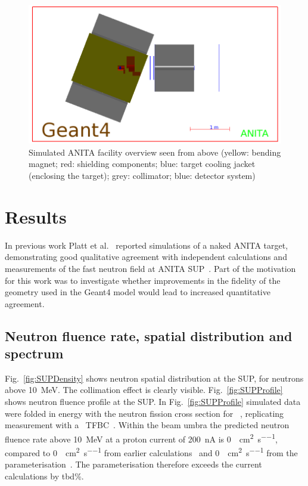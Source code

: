 \documentclass[11pt,a4paper]{IEEEtran}
\let\MYoriglatexcaption\caption
\renewcommand{\caption}[2][\relax]{\MYoriglatexcaption[#2]{#2}}
\def\U238{\BPChem{\^{238}U}}
\begin{document}
\begin{figure}[t]
	\centering
	\includegraphics[width=\columnwidth]{overview.png}
	\caption{
        Simulated ANITA facility overview seen from above (yellow: bending magnet; red: shielding components; blue: target cooling jacket (enclosing the target); grey: collimator; blue: detector system)
    }
	\label{fig:ANITAoverview}
\end{figure}

\section{Results}
In previous work Platt et al.~\cite{Platt13} reported simulations of a naked ANITA target, demonstrating good qualitative agreement with independent calculations and measurements of the fast neutron field at ANITA SUP~\cite{Prokofiev2009}.
Part of the motivation for this work was to investigate whether improvements in the fidelity of the geometry used in the Geant4 model would lead to increased quantitative agreement.

\subsection{Neutron fluence rate, spatial distribution and spectrum}
Fig.~\ref{fig:SUPDensity} shows neutron spatial distribution at the SUP, for neutrons above \SI{10}{\MeV}.
The collimation effect is clearly visible.
Fig.~\ref{fig:SUPProfile} shows neutron fluence profile at the SUP.
In Fig.~\ref{fig:SUPProfile} simulated data were folded in energy with the neutron fission cross section for \U238~\cite{tbd}, replicating measurement with a \U238\ TFBC~\cite{Prokofiev2009}.
Within the beam umbra the predicted neutron fluence rate above \SI{10}{\MeV} at a proton current of \SI{200}{\nA} is \SI{0}{\neutron\per\cm\squared\per\second}, compared to \SI{0}{\neutron\per\cm\squared\per\second} from earlier calculations~\cite{Platt13} and \SI{0}{\neutron\per\cm\squared\per\second} from the parameterisation~\cite{Prokofiev2009}.
The parameterisation therefore exceeds the current calculations by tbd\%.
\end{document}
